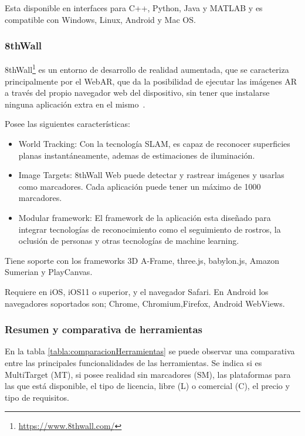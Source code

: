 Esta disponible en interfaces para C++, Python, Java y MATLAB y es compatible con Windows, Linux, Android y Mac OS.


\subsubsection{8thWall}

8thWall\footnote{\url{https://www.8thwall.com/}}
es un entorno de desarrollo de realidad aumentada, que se caracteriza principalmente por el WebAR, que da la posibilidad de ejecutar las imágenes AR a través del propio navegador web del dispositivo, sin tener que instalarse ninguna aplicación extra en el mismo~\cite{8thwall_products}.

Posee las siguientes características:

\begin{itemize}
	\item World Tracking: Con la tecnología SLAM, es capaz de reconocer superficies planas instantáneamente, ademas de estimaciones de iluminación.
	\item Image Targets: 8thWall Web puede detectar y rastrear imágenes y usarlas como marcadores. Cada aplicación puede tener un máximo de 1000 marcadores.
	\item Modular framework: El framework de la aplicación esta diseñado para integrar tecnologías de reconocimiento como el seguimiento de rostros, la oclusión de personas y otras tecnologías de machine learning.
\end{itemize}


Tiene soporte con los frameworks 3D A-Frame, three.js, babylon.js, Amazon Sumerian y PlayCanvas.

Requiere en iOS, iOS11 o superior, y el navegador Safari. En Android los navegadores soportados son; Chrome, Chromium,Firefox, Android WebViews.

\subsubsection{Resumen y comparativa de herramientas}
En la tabla \ref{tabla:comparacionHerramientas} se puede observar una comparativa entre las principales funcionalidades de las herramientas. Se indica si es MultiTarget (MT), si posee realidad sin marcadores (SM), las plataformas para las que está disponible, el tipo de licencia, libre (L) o comercial (C), el precio y tipo de requisitos.

